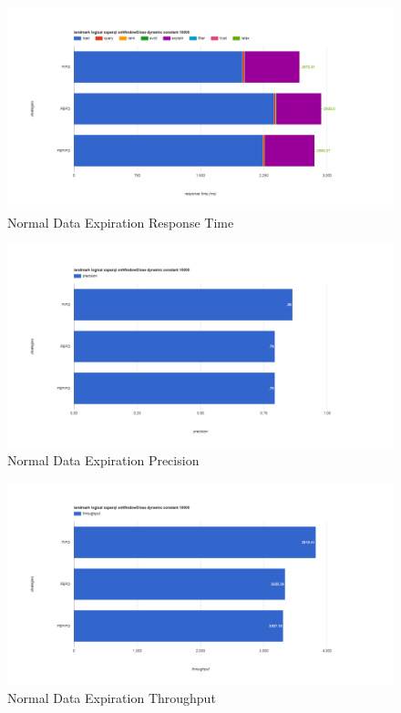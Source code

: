 \begin{figure}[!htbp]
    \centering
    \includegraphics[width=\textwidth]{img/app3-ets-normal-r.png}
    \caption{Normal Data Expiration Response Time}
\end{figure}
\begin{figure}[!htbp]
    \centering
    \includegraphics[width=\textwidth]{img/app3-ets-normal-p.png}
    \caption{Normal Data Expiration Precision}
\end{figure}
\begin{figure}[!htbp]
    \centering
    \includegraphics[width=\textwidth]{img/app3-ets-normal-t.png}
    \caption{Normal Data Expiration Throughput}
\end{figure}
